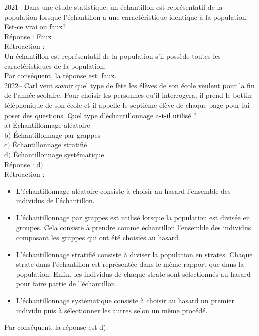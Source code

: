 \documentclass[letterpaper, 12pt]{article}
\begin{document}
2021-- Dans une \'etude statistique, un \'echantillon est repr\'esentatif de la population lorsque l'\'echantillon a une caract\'eristique identique \`a la population. Est-ce vrai ou faux?\\

R\'eponse : Faux\\

R\'etroaction :\\
Un \'echantillon est repr\'esentatif de la population s'il poss\`ede toutes les caract\'eristiques de la population. \\
Par cons\'equent, la r\'eponse est: faux.\\


2022-- Carl veut savoir quel type de f\^ete les \'el\`eves de son \'ecole veulent pour la fin de l'ann\'ee scolaire. Pour choisir les personnes qu'il interrogera, il prend le bottin t\'el\'ephonique de son \'ecole et il appelle le septi\`eme \'el\`eve de chaque page pour lui poser des questions. Quel type d'\'echantillonnage a-t-il utilis\'e ?\\

a$)$ \'Echantillonnage al\'eatoire\\
b$)$ \'Echantillonnage par grappes\\
c$)$ \'Echantillonnage stratifi\'e\\
d$)$ \'Echantillonnage syst\'ematique\\

R\'eponse : d$)$\\

R\'etroaction :\\
\begin{itemize}
 \item L'\'echantillonnage al\'eatoire consiste \`a choisir au hasard l'ensemble des individus de l'\'echantillon. \\
\item L'\'echantillonnage par grappes est utilis\'e lorsque la population est divis\'ee en groupes. Cela consiste \`a prendre comme \'echantillon l'ensemble des individus composant les grappes qui ont \'et\'e choisies au hasard. \\
\item L'\'echantillonnage stratifi\'e consiste \`a diviser la population en strates. Chaque strate dans l'\'echantillon est repr\'esent\'ee dans le m\^eme rapport que dans la population. Enfin, les individus de chaque strate sont s\'electionn\'es au hasard pour faire partie de l'\'echantillon. \\
\item L'\'echantillonnage syst\'ematique consiste \`a choisir au hasard un premier individu puis \`a s\'electionner les autres selon un m\^eme proc\'ed\'e. \\
\end{itemize}
Par cons\'equent, la r\'eponse est d).\\
\end{document}
